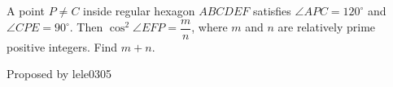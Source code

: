 A point $P \neq C$ inside regular hexagon $ABCDEF$ satisfies $\angle APC=120^\circ$ and $\angle CPE=90^\circ$. Then $\cos^2\angle EFP = \dfrac{m}{n}$, where $m$ and $n$ are relatively prime positive integers. Find $m+n$.



 Proposed by lele0305

